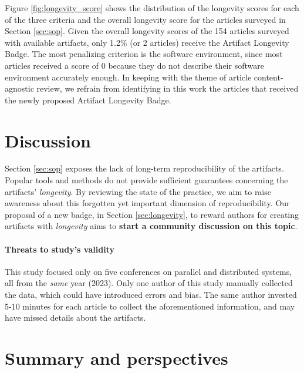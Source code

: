 \documentclass[sigconf,natbib=false]{acmart}
\newcommand{\todo}[1]{{\color{red}{TODO: #1}}}
\begin{document}
Figure \ref{fig:longevity_score} shows the distribution of the longevity scores for each of the three criteria and the overall longevity score for the articles surveyed in Section \ref{sec:sop}.
Given the overall longevity scores of the 154 articles surveyed with available artifacts, only 1.2\% (or 2 articles) receive the Artifact Longevity Badge.
The most penalizing criterion is the software environment, since most articles received a score of 0 because they do not describe their software environment accurately enough. %
In keeping with the theme of article content-agnostic review, we refrain from identifying in this work the articles that received the newly proposed Artifact Longevity Badge. 




\section{Discussion}\label{sec:discussion}

Section \ref{sec:sop} exposes the lack of long-term reproducibility of the artifacts.
Popular tools and methods do not provide sufficient guarantees concerning the artifacts' \emph{longevity}.
By reviewing the state of the practice, we aim to raise awareness about this forgotten yet important dimension of reproducibility.
Our proposal of a new badge, in Section \ref{sec:longevity}, to reward authors for creating artifacts with \emph{longevity} aims to \textbf{start a community discussion on this topic}.


\paragraph{Threats to study's validity}

This study focused only on five conferences on parallel and distributed systems, all from the \emph{same} year (2023).
Only one author of this study manually collected the data, which could have introduced errors and bias.
The same author invested 5-10 minutes for each article to collect the aforementioned information, and may have missed details about the artifacts.


\section{Summary and perspectives}\label{sec:conclu}
\end{document}
